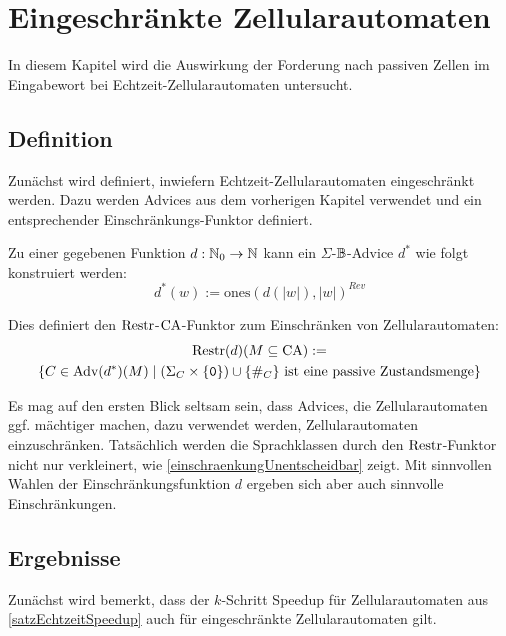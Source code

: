 \chapter{Eingeschränkte Zellularautomaten}
\label{chap:EingeschrAuto}

In diesem Kapitel wird die Auswirkung der Forderung nach passiven Zellen im Eingabewort
bei Echtzeit-Zellularautomaten untersucht.

\section{Definition}

Zunächst wird definiert, inwiefern Echtzeit-Zellularautomaten eingeschränkt werden.
Dazu werden Advices aus dem vorherigen Kapitel verwendet und ein entsprechender Einschränkungs-Funktor definiert.

\begin{definition}
    Zu einer gegebenen Funktion $d: \mathbb{N}_0 \to \mathbb{N}$ kann ein $\Sigma$-$\mathbb{B}$-Advice $d^*$ wie folgt konstruiert werden:
    \[
        d^*(w) := \mathrm{ones}(d(|w|), |w|)^{Rev}
    \]        

    Dies definiert den $\mathrm{Restr}$-$\textrm{CA}$-Funktor zum Einschränken von Zellularautomaten:
    \begin{multline*}
        \mathrm{Restr}(d)(M \subseteq \textrm{CA}) := \\
            \{ { C \in \textrm{Adv}(d^*)(M) } \; | \; {
                (\Sigma_C \times \{ { \texttt{0} } \}) \cup \{ { \#_C } \} \text{ ist eine passive Zustandsmenge} } \}
    \end{multline*}
\end{definition}

Es mag auf den ersten Blick seltsam sein, dass Advices, die Zellularautomaten \acs{ggf.} mächtiger machen,
dazu verwendet werden, Zellularautomaten einzuschränken.
Tatsächlich werden die Sprachklassen durch den $\mathrm{Restr}$-Funktor nicht nur verkleinert,
wie \cref{einschraenkungUnentscheidbar} zeigt.
Mit sinnvollen Wahlen der Einschränkungsfunktion $d$ ergeben sich aber auch sinnvolle Einschränkungen.

\section{Ergebnisse}

Zunächst wird bemerkt, dass der $k$-Schritt Speedup für Zellularautomaten aus \cref{satzEchtzeitSpeedup}
auch für eingeschränkte Zellularautomaten gilt.

